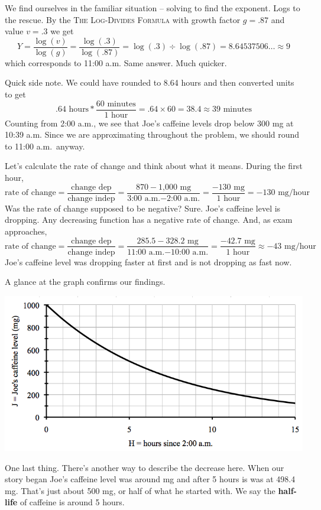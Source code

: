 We find ourselves in the familiar situation -- solving to find the exponent.  Logs to the rescue.  By the
\textsc{The Log-Divides Formula} with growth factor $g=.87$ and value $v= .3$ we get $$Y =  \frac{\log (v)}{\log(g)}=  \frac{\log (.3)}{\log(.87)} =  \log (.3) \div \log (.87) =  8.64537506\ldots \approx 9 $$ 
which corresponds to 11:00 a.m.  Same answer.  Much quicker.

Quick side note.  We could have rounded to 8.64 hours and then converted units to get
$$.64 \text{ hours} \ast \frac{60 \text{ minutes}}{1 \text{ hour}} = .64 \times 60 = 38.4 \approx 39 \text{ minutes}$$
Counting from  2:00 a.m., we see that Joe's caffeine levels drop below 300 mg at 10:39 a.m.  Since we are approximating throughout the problem, we should round to 11:00 a.m.\  anyway.

Let's calculate the rate of change and think about what it means.  During the first hour,
$$\text{rate of change} =  \frac{\text{change dep}}{\text{change indep}} 
= \frac{870-\text{1,000 mg}}{\text{3:00 a.m.} - \text{2:00 a.m.}} = \frac{-130 \text{ mg}}{1 \text{ hour}} = -130 \text{ mg/hour}$$
Was the rate of change supposed to be negative? Sure.  Joe's caffeine level is dropping.  Any decreasing function has a negative rate of change.
And, as exam approaches,
$$\text{rate of change} =  \frac{\text{change dep}}{\text{change indep}}  = \frac{285.5-328.2 \text{ mg}}{\text{11:00 a.m.} - \text{10:00 a.m.}} = \frac{-42.7 \text{ mg}}{1 \text{ hour}} \approx -43 \text{ mg/hour}$$
Joe's caffeine level was dropping faster at first and is not dropping as fast now.  

A glance at the graph confirms our findings.
 \begin{center}
 {\includegraphics [width = 6in] {caffeine.png}}
\end{center}

One last thing.  There's another way to describe the decrease here.  When our story began Joe's caffeine level was around  mg and after 5 hours is was at 498.4 mg.  That's just about 500 mg, or half of what he started with.  We say the \textbf{half-life} of caffeine is around 5 hours.  

